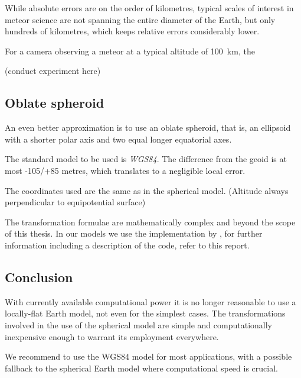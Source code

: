        While absolute errors are on the order of kilometres, typical scales of interest
        in meteor science are not spanning the entire diameter of the Earth,
        but only hundreds of kilometres, which keeps relative errors considerably lower.

        For a camera observing a meteor at a typical altitude of \SI{100}{\kilo\metre},
        the 

        (conduct experiment here)


    \subsection{Oblate spheroid} \label{mmw}
        An even better approximation is to use an oblate spheroid,
        that is, an ellipsoid with a shorter polar axis and two
        equal longer equatorial axes.

        The standard model to be used is \emph{WGS84}.
        The difference from the geoid is at most -105/+85 metres,
        which translates to a negligible local error.

        The coordinates used are the same as in the spherical model. (Altitude always perpendicular to equipotential surface)

        The transformation formulae are mathematically complex and beyond the scope of this thesis.
        In our models we use the implementation by \cite{osen2017},
        for further information including a description of the code, refer to this report.

    \subsection{Conclusion}
        With currently available computational power it is no longer reasonable to
        use a locally-flat Earth model, not even for the simplest cases.
        The transformations involved in the use of the spherical model
        are simple and computationally inexpensive enough to warrant its employment everywhere.

        We recommend to use the WGS84 model for most applications, with a possible
        fallback to the spherical Earth model where computational speed is crucial.

